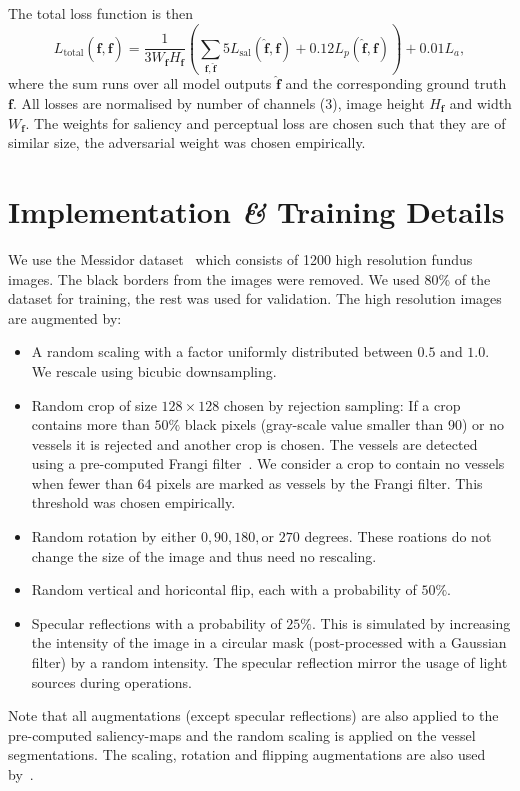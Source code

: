 \documentclass{scrartcl}
\newcommand{\img}{\bm{f}} %
\begin{document}
The total loss function is then
\begin{equation}
  \label{eq:total-loss}
L_\text{total}(\hat{\img}, \img) = \frac{1}{3 W_{\img} H_{\img}}
\left( \sum_{\img, \hat{\img}}
  5 L_{\text{sal}} (\hat{\img}, \img) + 0.12  L_p(\hat{\img}, \img) \right) + 0.01 L_a,
\end{equation}
where the sum runs over all model outputs \(\hat{\img}\) and the corresponding ground truth \(\img\).
All losses are normalised by number of channels (3), image height \(H_{\img}\) and width \(W_{\img}\).
The weights for saliency and perceptual loss are chosen such that they are of similar size, the adversarial weight was chosen empirically.

\section{Implementation \textit{\&} Training Details}
We use the Messidor dataset~\cite{Messidor} which consists of 1200 high resolution fundus images.
The black borders from the images were removed.
We used 80\% of the dataset for training, the rest was used for validation.
The high resolution images are augmented by:
\begin{itemize}
\item A random scaling with a factor uniformly distributed between $0.5$ and $1.0$.
  We rescale using bicubic downsampling.
\item Random crop of size $128 \times 128$ chosen by rejection sampling:
If a crop contains more than $50\%$ black pixels (gray-scale value smaller than 90) or no vessels it is rejected and another crop is chosen.
The vessels are detected using a pre-computed Frangi filter~\cite{Frangi}.
We consider a crop to contain no vessels when fewer than $64$ pixels are marked as vessels by the Frangi filter.
This threshold was chosen empirically.
\item Random rotation by either $0, 90, 180, \text{or } 270$ degrees.
  These roations do not change the size of the image and thus need no rescaling.
\item Random vertical and horicontal flip, each with a probability of $50\%$.
\item Specular reflections with a probability of $25\%$.
This is simulated by increasing the intensity of the image in a circular mask (post-processed with a Gaussian filter) by a random intensity.
The specular reflection mirror the usage of light sources during operations.
\end{itemize}
Note that all augmentations (except specular reflections) are also applied to the pre-computed saliency-maps and the random scaling is applied on the vessel segmentations.
The scaling, rotation and flipping augmentations are also used by~\cite{LapSRN}.
\end{document}
